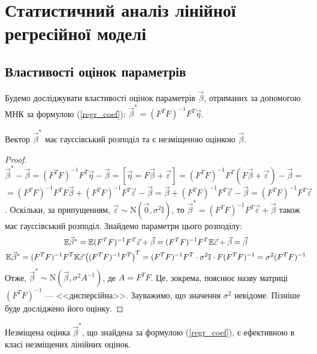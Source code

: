 \section{Статистичний аналіз лінійної регресійної моделі}
\subsection{Властивості оцінок параметрів}
Будемо досліджувати властивості оцінок параметрів $\vec{\beta}$, отриманих за допомогою МНК
за формулою (\ref{regr_coef}): $\vec{\beta}^* = (F^T F)^{-1} F^T \vec{\eta}$.
\begin{proposition}\label{regr_unbiased}
    Вектор $\vec{\beta}^*$ має гауссівський розподіл та є незміщеною оцінкою $\vec{\beta}$.
\end{proposition}
\begin{proof}
    $\vec{\beta}^* - \vec{\beta} = (F^T F)^{-1} F^T \vec{\eta} - \vec{\beta} = 
    \left[\vec{\eta} = F\vec{\beta} + \vec{\varepsilon}\right] =
    (F^T F)^{-1} F^T (F\vec{\beta} + \vec{\varepsilon}) - \vec{\beta} = $\\
    $= (F^T F)^{-1} F^T F \vec{\beta} + (F^T F)^{-1} F^T \vec{\varepsilon} - \vec{\beta} = 
    \vec{\beta} + (F^T F)^{-1} F^T \vec{\varepsilon} - \vec{\beta} = (F^T F)^{-1} F^T \vec{\varepsilon}$.
    Оскільки, за припущенням, $\vec{\varepsilon} \sim \mathrm{N}(\vec{0}, \sigma^2 \mathbb{I})$,
    то $\vec{\beta}^* = (F^T F)^{-1} F^T \vec{\varepsilon} + \vec{\beta}$ також має гауссівський розподіл.
    Знайдемо параметри цього розподілу:
    \begin{gather*}
        \mathbb{E}\vec{\beta}^* = \mathbb{E} (F^T F)^{-1} F^T \vec{\varepsilon} + \vec{\beta} = 
        (F^T F)^{-1} F^T \mathbb{E}\vec{\varepsilon} + \vec{\beta} = \vec{\beta} \\
        \mathbb{K}\vec{\beta}^* = (F^T F)^{-1} F^T \mathbb{K}\vec{\varepsilon} \left((F^T F)^{-1} F^T\right)^T = 
        (F^T F)^{-1} F^T \cdot \sigma^2 \mathbb{I} \cdot F (F^T F)^{-1} = \sigma^2 (F^T F)^{-1}
    \end{gather*}
    Отже, $\vec{\beta}^* \sim \mathrm{N}(\vec{\beta}, \sigma^2 A^{-1})$, де $A = F^T F$.
    Це, зокрема, пояснює назву матриці $(F^T F)^{-1}$ --- <<дисперсійна>>.
    Зауважимо, що значення $\sigma^2$ невідоме. Пізніше буде досліджено його оцінку.
\end{proof}
\begin{proposition} Незміщена оцінка $\vec{\beta}^*$, що знайдена за формулою
    (\ref{regr_coef}), є ефективною в класі незміщених лінійних оцінок.
\end{proposition}

